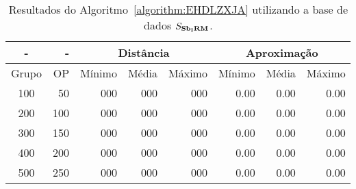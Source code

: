 \begin{table}[!htb]
  \caption{Resultados do Algoritmo~\ref{algorithm:EHDLZXJA} utilizando a base de dados $S_{\textbf{Sb\textsubscript{I}RM}}{}$.}
  \label{table:CDIOXZDV}
  \centering
  \begin{tabular}{|c|r|r|r|r|r|r|r|}
    \hline
      -      &  -   & \multicolumn{3}{c|}{Distância}             & \multicolumn{3}{c|}{Aproximação}           \\ \hline
    Grupo    & OP   & Mínimo       & Média        & Máximo       & Mínimo       & Média        & Máximo       \\ \hline  
    100      & 50   & 000          & 000          & 000          & 0.00         & 0.00         & 0.00         \\ \hline
    200      & 100  & 000          & 000          & 000          & 0.00         & 0.00         & 0.00         \\ \hline
    300      & 150  & 000          & 000          & 000          & 0.00         & 0.00         & 0.00         \\ \hline
    400      & 200  & 000          & 000          & 000          & 0.00         & 0.00         & 0.00         \\ \hline
    500      & 250  & 000          & 000          & 000          & 0.00         & 0.00         & 0.00         \\ \hline    
  \end{tabular}
\end{table}